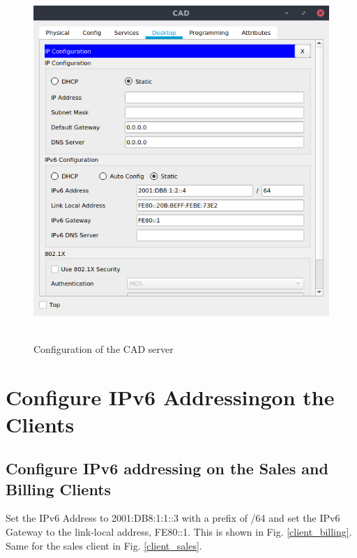 \documentclass[conference]{IEEEtran}
\begin{document}
\begin{center}
\begin{figure}[h]
\includegraphics[scale=0.45]{resources/q22.png}\
\caption{Configuration of the CAD server}
\label{server_cad}
\end{figure}
\end{center}

\section{Configure IPv6 Addressingon the Clients}

\subsection{Configure IPv6 addressing on the Sales and Billing Clients}
Set the IPv6 Address to 2001:DB8:1:1::3 with a prefix of /64 and set the IPv6 Gateway to the link-local address, FE80::1. This is shown in Fig. \ref{client_billing}. Same for the sales client in Fig. \ref{client_sales}.
\end{document}
